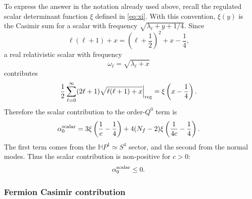 \documentclass[a4paper,11pt]{article}
\begin{document}
To express the answer in the notation already used above, recall the regulated scalar determinant function $\xi$ defined in \eqref{eq:xi}. With this convention, $\xi(y)$ is the Casimir sum for a scalar with frequency $\sqrt{\lambda_\ell+y+1/4}$. Since
\begin{equation}
  \ell(\ell+1)+x=\left(\ell+\frac12\right)^2+x-\frac14,
\end{equation}
a real relativistic scalar with frequency
\begin{equation}
  \omega_\ell=\sqrt{\lambda_\ell+x}
\end{equation}
contributes
\begin{equation}
  \frac12 \sum_{\ell=0}^{\infty} (2\ell+1)\sqrt{\ell(\ell+1)+x}\Big|_{\rm reg} = \xi\left(x-\frac14\right). \label{eq:sqcd-xi-shift}
\end{equation}
Therefore the scalar contribution to the order-$Q^0$ term is
\begin{equation}
  \alpha_0^{\rm scalar} = 3\xi\left(\frac1c-\frac14\right) + 4(N_f-2)\xi\left(\frac1{4c}-\frac14\right). \label{eq:sqcd-alpha0}
\end{equation}
The first term comes from the $\mathbb HP^1\simeq S^4$ sector, and the second from the normal modes. Thus the scalar contribution is non-positive for $c>0$:
\begin{equation}
  \alpha_0^{\rm scalar}\leq0.
\end{equation}

\subsubsection{Fermion Casimir contribution}
\end{document}
